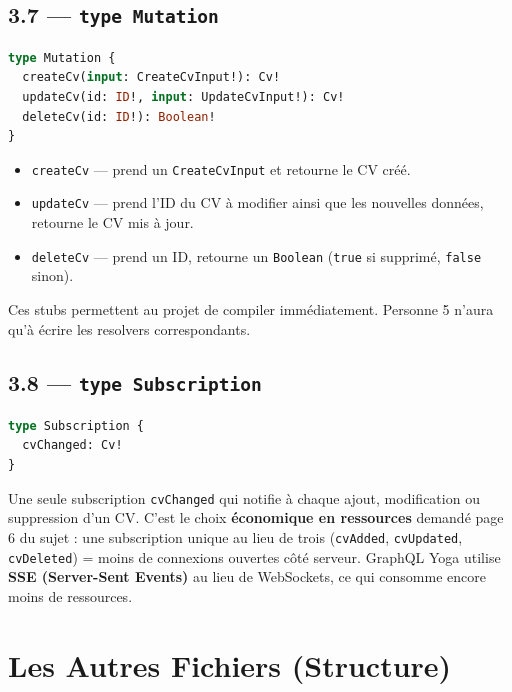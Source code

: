 \documentclass[12pt,a4paper]{article}
\begin{document}
\subsection{3.7 --- \texttt{type Mutation}}

\begin{lstlisting}[language=GraphQL, caption={Déclaration des Mutations}]
type Mutation {
  createCv(input: CreateCvInput!): Cv!
  updateCv(id: ID!, input: UpdateCvInput!): Cv!
  deleteCv(id: ID!): Boolean!
}
\end{lstlisting}

\begin{itemize}
  \item \texttt{createCv} --- prend un \texttt{CreateCvInput} et retourne le CV créé.
  \item \texttt{updateCv} --- prend l'ID du CV à modifier ainsi que les nouvelles données, retourne le CV mis à jour.
  \item \texttt{deleteCv} --- prend un ID, retourne un \texttt{Boolean} (\texttt{true} si supprimé, \texttt{false} sinon).
\end{itemize}

Ces stubs permettent au projet de compiler immédiatement. Personne 5 n'aura qu'à écrire les resolvers correspondants.

\subsection{3.8 --- \texttt{type Subscription}}

\begin{lstlisting}[language=GraphQL, caption={Déclaration de la Subscription}]
type Subscription {
  cvChanged: Cv!
}
\end{lstlisting}

Une seule subscription \texttt{cvChanged} qui notifie à chaque ajout, modification ou suppression d'un CV. C'est le choix \textbf{économique en ressources} demandé page 6 du sujet : une subscription unique au lieu de trois (\texttt{cvAdded}, \texttt{cvUpdated}, \texttt{cvDeleted}) = moins de connexions ouvertes côté serveur. GraphQL Yoga utilise \textbf{SSE (Server-Sent Events)} au lieu de WebSockets, ce qui consomme encore moins de ressources.

\section{Les Autres Fichiers (Structure)}
\end{document}
